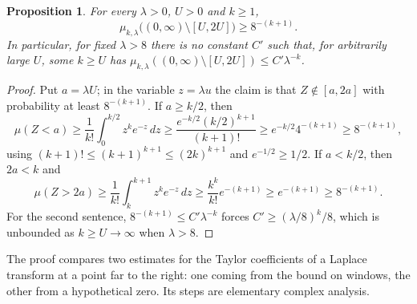 \documentclass[11pt]{amsbook}
\theoremstyle{plain}
\newtheorem{proposition}[theorem]{Proposition}
\theoremstyle{definition}
\theoremstyle{remark}
\numberwithin{equation}{section}
\numberwithin{figure}{chapter}
\numberwithin{table}{chapter}
\begin{document}
\begin{proposition}\label{prop:gamma-no-sigma-gain}
For every $\lambda>0$, $U>0$ and $k\ge1$,
\[
\mu_{k,\lambda}\bigl((0,\infty)\setminus[U,2U]\bigr)\ge8^{-(k+1)}.
\]
In particular, for fixed $\lambda>8$ there is no constant $C'$ such
that, for arbitrarily large $U$, some $k\ge U$ has
$\mu_{k,\lambda}((0,\infty)\setminus[U,2U])\le C'\lambda^{-k}$.
\end{proposition}

\begin{proof}
Put $a=\lambda U$; in the variable $z=\lambda u$ the claim is that
$Z\notin[a,2a]$ with probability at least $8^{-(k+1)}$. If
$a\ge k/2$, then
\[
\mu(Z<a)\ge\frac1{k!}\int_0^{k/2}z^ke^{-z}\,dz
\ge\frac{e^{-k/2}(k/2)^{k+1}}{(k+1)!}\ge e^{-k/2}4^{-(k+1)}
\ge8^{-(k+1)},
\]
using $(k+1)!\le(k+1)^{k+1}\le(2k)^{k+1}$ and $e^{-1/2}\ge1/2$. If
$a<k/2$, then $2a<k$ and
\[
\mu(Z>2a)\ge\frac1{k!}\int_k^{k+1}z^ke^{-z}\,dz
\ge\frac{k^k}{k!}e^{-(k+1)}\ge e^{-(k+1)}\ge8^{-(k+1)} .
\]
For the second sentence, $8^{-(k+1)}\le C'\lambda^{-k}$ forces
$C'\ge(\lambda/8)^k/8$, which is unbounded as $k\ge U\to\infty$ when
$\lambda>8$.
\end{proof}

The proof compares two estimates for the Taylor coefficients of a
Laplace transform at a point far to the right: one coming from the
bound on windows, the other from a hypothetical zero. Its steps are
elementary complex analysis.
\end{document}
